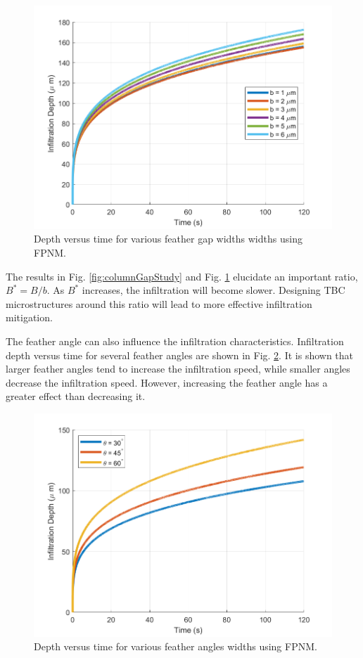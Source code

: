 \documentclass{UCF_ETD}
\begin{document}
\begin{figure}[htp!]
    \centering
    \includegraphics[width=\linewidth]{Figures/featherGapStudy.png}
    \caption{Depth versus time for various feather gap widths widths using FPNM.}
    \label{fig:featherGapStudy}
\end{figure}

The results in Fig. \ref{fig:columnGapStudy} and Fig. \ref{fig:featherGapStudy} elucidate an important ratio,  $B^{*} = B/b$. As $B^{*}$ increases, the infiltration will become slower. Designing TBC microstructures around this ratio will lead to more effective infiltration mitigation.

The feather angle can also influence the infiltration characteristics. Infiltration depth versus time for several feather angles are shown in Fig. \ref{fig:angleStudy}. It is shown that larger feather angles tend to increase the infiltration speed, while smaller angles decrease the infiltration speed. However, increasing the feather angle has a greater effect than decreasing it.

\begin{figure}[htp!]
    \centering
    \includegraphics[width=\linewidth]{Figures/featherAngleStudy.png}
    \caption{Depth versus time for various feather angles widths using FPNM.}
    \label{fig:angleStudy}
\end{figure}
\end{document}
